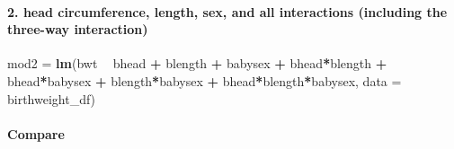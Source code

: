 \documentclass[]{article}
\newenvironment{Shaded}{\begin{snugshade}}{\end{snugshade}}
\newcommand{\DataTypeTok}[1]{\textcolor[rgb]{0.13,0.29,0.53}{#1}}
\newcommand{\KeywordTok}[1]{\textcolor[rgb]{0.13,0.29,0.53}{\textbf{#1}}}
\newcommand{\NormalTok}[1]{#1}
\newcommand{\OperatorTok}[1]{\textcolor[rgb]{0.81,0.36,0.00}{\textbf{#1}}}
\newcommand{\StringTok}[1]{\textcolor[rgb]{0.31,0.60,0.02}{#1}}
\let\oldparagraph\paragraph
\renewcommand{\paragraph}[1]{\oldparagraph{#1}\mbox{}}
\begin{document}
\hypertarget{head-circumference-length-sex-and-all-interactions-including-the-three-way-interaction}{%
\paragraph{2. head circumference, length, sex, and all interactions
(including the three-way
interaction)}\label{head-circumference-length-sex-and-all-interactions-including-the-three-way-interaction}}

\begin{Shaded}
\begin{Highlighting}[]
\NormalTok{mod2 =}\StringTok{ }\KeywordTok{lm}\NormalTok{(bwt }\OperatorTok{~}\StringTok{ }\NormalTok{bhead }\OperatorTok{+}\StringTok{ }\NormalTok{blength }\OperatorTok{+}\StringTok{ }\NormalTok{babysex }\OperatorTok{+}\StringTok{ }\NormalTok{bhead}\OperatorTok{*}\NormalTok{blength }\OperatorTok{+}\StringTok{ }\NormalTok{bhead}\OperatorTok{*}\NormalTok{babysex }\OperatorTok{+}\StringTok{ }\NormalTok{blength}\OperatorTok{*}\NormalTok{babysex }\OperatorTok{+}\StringTok{ }\NormalTok{bhead}\OperatorTok{*}\NormalTok{blength}\OperatorTok{*}\NormalTok{babysex, }\DataTypeTok{data =}\NormalTok{ birthweight_df)}
\end{Highlighting}
\end{Shaded}

\hypertarget{compare}{%
\paragraph{Compare}\label{compare}}
\end{document}
